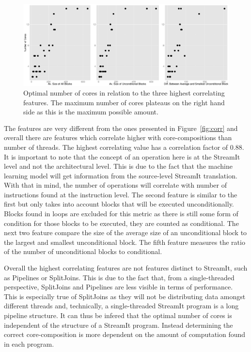 \begin{figure}[h]
  \center
  \includegraphics[width=1\textwidth]{streamit-paper/graphics/lineargraphs.pdf}
  \caption{Optimal number of cores in relation to the three highest correlating features. The maximum number of cores plateaus on the right hand side as this is the maximum possible amount.}\label{fig:maxav}
\end{figure}

The features are very different from the ones presented in Figure~\ref{fig:corr} and overall there are features which correlate higher with core-compositions than number of threads.
The highest correlating value has a correlation factor of 0.88.
It is important to note that the concept of an operation here is at the StreamIt level and not the architectural level.
This is due to the fact that the machine learning model will get information from the source-level StreamIt translation.
With that in mind, the number of operations will correlate with number of instructions found at the instruction level.
The second feature is similar to the first but only takes into account blocks that will be executed unconditionally.
Blocks found in loops are excluded for this metric as there is still some form of condition for those blocks to be executed, they are counted as conditional.
The next two feature compare the size of the average size of an unconditional block to the largest and smallest unconditional block.
The fifth feature measures the ratio of the number of unconditional blocks to conditional.

Overall the highest correlating features are not features distinct to StreamIt, such as Pipelines or SplitJoins.
This is due to the fact that, from a single-threaded perspective, SplitJoins and Pipelines are less visible in terms of performance.
This is especially true of SplitJoins as they will not be distributing data amongst different threads and, technically, a single-threaded StreamIt program is a long pipeline structure.
It can thus be infered that the optimal number of cores is independent of the structure of a StreamIt program.
Instead determining the correct core-composition is more dependent on the amount of computation found in each program.

